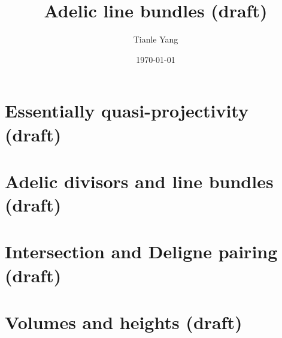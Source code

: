\documentclass[sectionlevel=chapter]{noteformyself}
\title{Adelic line bundles (draft)}
\author{Tianle Yang}
\date{\today}
\begin{document}
    \maketitle

    \tableofcontents

    \section{Essentially quasi-projectivity (draft)}
    
    \section{Adelic divisors and line bundles (draft)}
    
    \section{Intersection and Deligne pairing (draft)}
    
    \section{Volumes and heights (draft)}
    

    \printbibliography[heading=bibintoc, title={References}]
\end{document}
